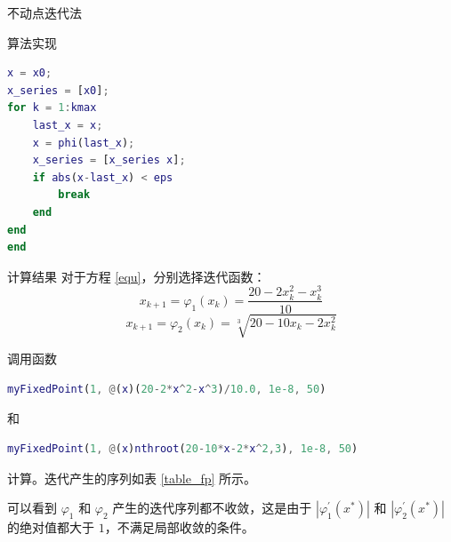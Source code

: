 \documentclass[a4paper]{article}
\begin{document}
\begin{multicols}{2}
\begin{section}{不动点迭代法}
\begin{subsection}{算法实现}
\begin{lstlisting}[language=Matlab]
x = x0;
x_series = [x0];
for k = 1:kmax
    last_x = x;
    x = phi(last_x);
    x_series = [x_series x];
    if abs(x-last_x) < eps
        break
    end
end
end	
		\end{lstlisting}
		
	\end{subsection}
	
	\begin{subsection}{计算结果}
		对于方程 \ref{equ}，分别选择迭代函数：\begin{equation} 
			x_{k+1}=\varphi_1(x_k) = \frac{20-2 x_{k}^{2}-x_{k}^{3}}{10}
			\label{func1}
		\end{equation} 
		\begin{equation} 
			x_{k+1}=\varphi_2(x_k) = \sqrt[3]{20-10 x_{k}-2 x_{k}^{2}}
			\label{func2}
		\end{equation}
		
		调用函数 
		\begin{lstlisting}[language=Matlab]
myFixedPoint(1, @(x)(20-2*x^2-x^3)/10.0, 1e-8, 50)
		\end{lstlisting} 和
		 
		\begin{lstlisting}[language=Matlab]
myFixedPoint(1, @(x)nthroot(20-10*x-2*x^2,3), 1e-8, 50)
		\end{lstlisting} 计算。迭代产生的序列如表 \ref{table_fp} 所示。
		
		可以看到 $\varphi_1$ 和 $\varphi_2$ 产生的迭代序列都不收敛，这是由于 $|\varphi_1^\prime(x^*)|$ 和 $|\varphi_2^\prime(x^*)|$ 的绝对值都大于 $1$，不满足局部收敛的条件。
	

\end{subsection}
\end{section}
\end{multicols}
\end{document}
